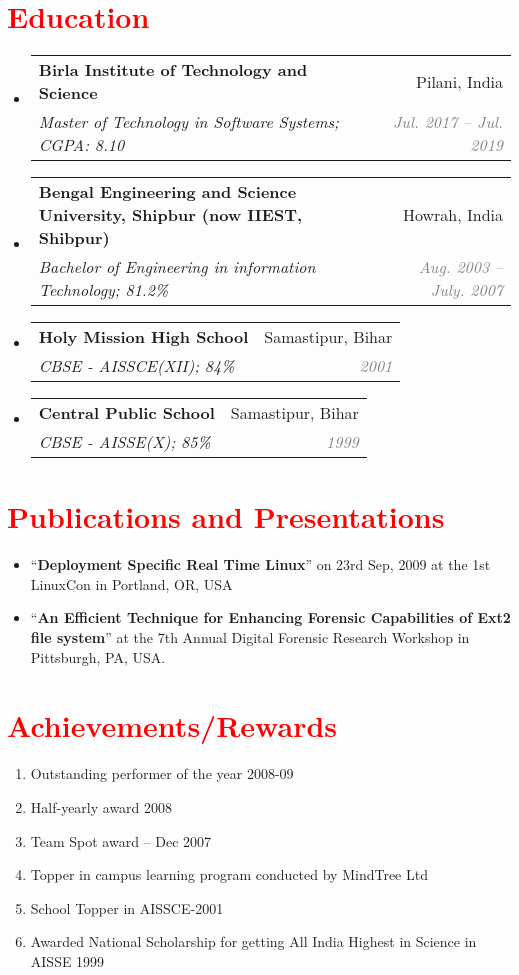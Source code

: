 \documentclass[letterpaper,11pt]{article}
\makeatletter
\newcommand{\resumeSubheading}[4]{
  \vspace{-1pt}\item
    \begin{tabular*}{0.97\textwidth}[t]{l@{\extracolsep{\fill}}r}
      \textbf{#1} & #2 \\
      \textit{\small#3} & \textit{\small #4} \\
    \end{tabular*}\vspace{-5pt}
}
\newcommand{\resumeSubHeadingListStart}{\begin{itemize}[leftmargin=*]}
\newcommand{\resumeSubHeadingListEnd}{\end{itemize}}
\makeatother
\begin{document}
\section{\textcolor{RED}{Education}}
  \resumeSubHeadingListStart
    \resumeSubheading
      {Birla Institute of Technology and Science}{\textcolor{RED1}{Pilani, India}}
      {Master of Technology in Software Systems;  CGPA: 8.10}{\textcolor{GRAY}{Jul. 2017 -- Jul. 2019}}
    \resumeSubheading
      {Bengal Engineering and Science University, Shipbur (now IIEST, Shibpur)}{\textcolor{RED1}{Howrah, India}}
      {Bachelor of Engineering in information Technology;  81.2\% }{\textcolor{GRAY}{Aug. 2003 -- July. 2007}}
      \resumeSubheading
      {Holy Mission High School}{\textcolor{RED1}{Samastipur, Bihar}}
      {CBSE - AISSCE(XII); 84\%}{\textcolor{GRAY}{2001}}
      \resumeSubheading
      {Central Public School}{\textcolor{RED1}{Samastipur, Bihar}}
      {CBSE - AISSE(X); 85\%}{\textcolor{GRAY}{1999}}
  \resumeSubHeadingListEnd

\section{\textcolor{RED}{Publications and Presentations}}
  \resumeSubHeadingListStart
    \item {“\textbf{Deployment Specific Real Time Linux}” on 23rd Sep, 2009 at the 1st LinuxCon in Portland, OR, USA}
    \item  {“\textbf{An Efficient Technique for Enhancing Forensic Capabilities of Ext2 file system}” at the 7th Annual Digital Forensic Research Workshop in Pittsburgh, PA, USA.}
  \resumeSubHeadingListEnd
  
  

\section{\textcolor{RED}{Achievements/Rewards}}
  \begin{enumerate}
    \item {Outstanding performer of the year 2008-09}
    \item {Half-yearly award 2008}
    \item{Team Spot award – Dec 2007}
    \item{Topper in campus learning program conducted by MindTree Ltd}
    \item{School Topper in AISSCE-2001}
    \item{Awarded National Scholarship for getting All India Highest in Science in AISSE 1999}  
    \end{enumerate}


\end{document}
